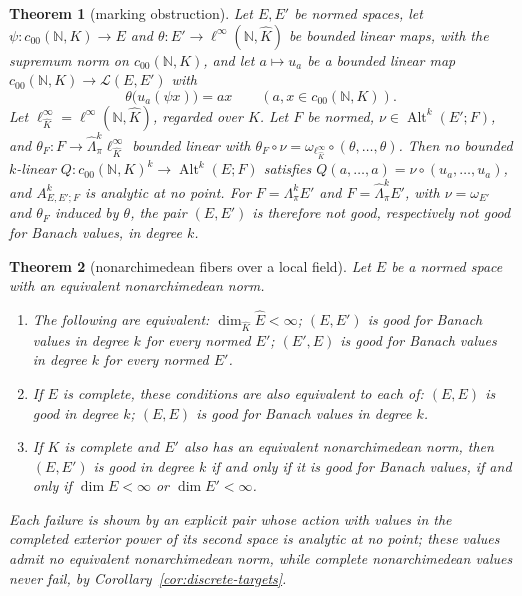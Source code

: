 \documentclass[11pt]{amsart}
\newtheorem{theorem}{Theorem}[section]
\theoremstyle{definition}
\theoremstyle{remark}
\numberwithin{equation}{section}
\newcommand{\N}{\mathbb N}
\newcommand{\cL}{\mathcal L}
\newcommand{\Alt}{\operatorname{Alt}}
\newcommand{\linf}{\ell^\infty}
\newcommand{\Kh}{\widehat K}
\theoremstyle{plain}
\theoremstyle{definition}
\theoremstyle{plain}
\begin{document}
\begin{theorem}[marking obstruction]\label{fib:thm:marking}
Let $E,E'$ be normed spaces, let $\psi\colon c_{00}(\N,K)\to E$ and $\theta\colon E'\to\linf(\N,\Kh)$ be bounded
linear maps, with the supremum norm on $c_{00}(\N,K)$, and let $a\mapsto u_a$ be a bounded linear map
$c_{00}(\N,K)\to\cL(E,E')$ with
\begin{equation}\label{fib:eq:marking}
 \theta\bigl(u_a(\psi x)\bigr)=ax\qquad(a,x\in c_{00}(\N,K)).
\end{equation}
Let $\linf_{\Kh}=\linf(\N,\Kh)$, regarded over $K$. Let $F$ be normed, $\nu\in\Alt^k(E';F)$, and
$\theta_F\colon F\to\widehat\Lambda^k_\pi\linf_{\Kh}$ bounded linear with
$\theta_F\circ\nu=\omega_{\linf_{\Kh}}\circ(\theta,\dots,\theta)$.
Then no bounded $k$\nobreakdash-linear $Q\colon c_{00}(\N,K)^k\to\Alt^k(E;F)$ satisfies $Q(a,\dots,a)=\nu\circ(u_a,\dots,u_a)$,
and $A^k_{E,E';F}$ is analytic at no point. For $F=\Lambda^k_\pi E'$ and $F=\widehat\Lambda^k_\pi E'$, with
$\nu=\omega_{E'}$ and $\theta_F$ induced by $\theta$, the pair $(E,E')$ is therefore not good, respectively not good for
Banach values, in degree $k$.
\end{theorem}

\begin{theorem}[nonarchimedean fibers over a local field]\label{fib:thm:local}
Let $E$ be a normed space with an equivalent nonarchimedean norm.
\begin{enumerate}
\item The following are equivalent: $\dim_{\Kh}\widehat E<\infty$; $(E,E')$ is good for Banach values in degree $k$ for every normed
$E'$; $(E',E)$ is good for Banach values in degree $k$ for every normed $E'$.
\item If $E$ is complete, these conditions are also equivalent to each of: $(E,E)$ is good in degree $k$; $(E,E)$ is
good for Banach values in degree $k$.
\item If $K$ is complete and $E'$ also has an equivalent nonarchimedean norm, then $(E,E')$ is good in degree $k$ if and
only if it is good for Banach values, if and only if $\dim E<\infty$ or $\dim E'<\infty$.
\end{enumerate}
Each failure is shown by an explicit pair whose action with values in the completed exterior power of its second space
is analytic at no point; these values admit no equivalent nonarchimedean norm, while complete nonarchimedean values
never fail, by Corollary~\ref{cor:discrete-targets}.
\end{theorem}
\end{document}
